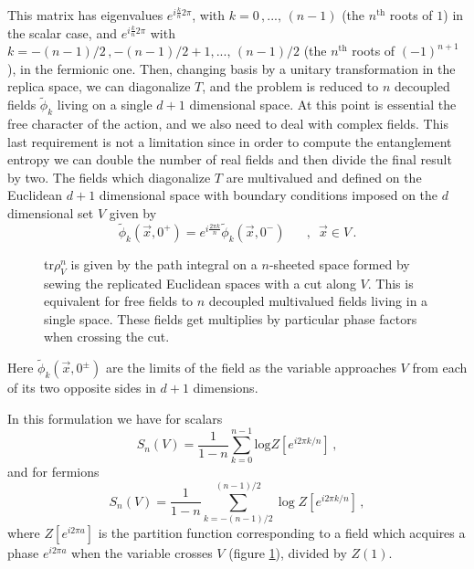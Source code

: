 \documentclass[11pt]{article}
\begin{document}
This matrix has eigenvalues $e^{i\frac{k}{n}2\pi }$, with
$k=0\,,...,\,(n-1)$ (the $n^{\textrm{th}}$ roots of $1$) in the scalar case, and $e^{i\frac{k}{n}2\pi }$ with $k=-(n-1)/2\,, -(n-1)/2+1,...,\,(n-1)/2$ (the $n^{\textrm{th}}$ roots of $(-1)^{n+1}$), in the fermionic one. 
Then, changing basis by a unitary transformation in the replica space,
we can diagonalize $T$, and the problem is reduced to $n$ decoupled
fields $\tilde{\phi}_{k}$ living on a single $d+1$ dimensional space. At this point is essential the free character of the action, and we also need to deal with complex fields. This last requirement is not a limitation since in order to compute the entanglement entropy we can double the number of real fields and then divide the final result by two. The fields which diagonalize $T$ are multivalued and defined on the Euclidean $d+1$ dimensional space with boundary conditions imposed on the $d$ dimensional set $V$ given by
\begin{equation}
\tilde{\phi}_k(\vec{x},0^+)=e^{i\frac{2 \pi k}{n}}\tilde{\phi}_k(\vec{x},0^-)\,\,\,\,\,\,\,\,\,\,,\,\, \, \vec{x}\in V\,.
\label{bc}
\end{equation}
\begin{figure} [tbp]
\centering
\leavevmode
\epsfxsize=10cm
\bigskip
{}
\caption{tr$\rho^n_V$ is given by the path integral on a $n$-sheeted space formed by sewing the replicated Euclidean spaces with a cut along $V$.  This is equivalent for free fields to $n$ decoupled multivalued fields living in a single space. These fields get multiplies by particular phase factors when crossing the cut.}
\label{figu2}
\end{figure}
Here $\tilde{\phi}_k(\vec{x},0^\pm)$ are the limits of the field as the variable approaches $V$ from each of its two opposite sides in $d+1$ dimensions.
 
In this formulation we have for scalars 
\begin{equation}
S_n(V)=\frac{1}{1-n}\sum_{k=0}^{n-1}\textrm{log}Z[e^{i 2 \pi k/n}]\,,
\label{r1}
\end{equation}
and for fermions 
\begin{equation}
S_n(V)=\frac{1}{1-n}\sum_{k=-(n-1)/2}^{(n-1)/2}\log Z[e^{i 2 \pi k/n}]\,,
\label{r2}
\end{equation}
where $Z[e^{i 2 \pi a}]$ is the partition function corresponding to a field which acquires a phase $e^{i2\pi a}$ when the variable crosses $V$ (figure \ref{figu2}), divided by $Z(1)$. 
\end{document}

